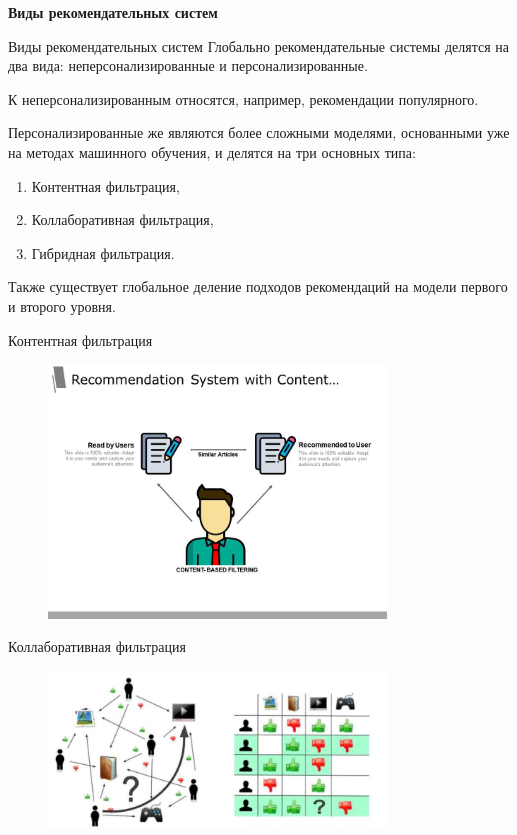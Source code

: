 \documentclass{beamer}
\begin{document}
\begin{frame}
  \begin{center}
    {\Huge \textbf{Виды рекомендательных систем}}
  \end{center}
\end{frame}

\begin{frame}{Виды рекомендательных систем}
  Глобально рекомендательные системы делятся на два вида: неперсонализированные и персонализированные.
  
  К неперсонализированным относятся, например, рекомендации популярного.

  Персонализированные же являются более сложными моделями, основанными уже на методах машинного обучения, и
  делятся на три основных типа:
  \begin{enumerate}
    \item Контентная фильтрация,
    \item Коллаборативная фильтрация,
    \item Гибридная фильтрация.
  \end{enumerate}

  Также существует глобальное деление подходов рекомендаций на модели первого и второго уровня.
\end{frame}

\begin{frame}{Контентная фильтрация}
  \begin{figure}[H]
    \centering
    \includegraphics[width=0.8\textwidth]{pic/2}
    \label{fig:img1}
  \end{figure}  
\end{frame}

\begin{frame}{Коллаборативная фильтрация}
  \begin{figure}[H]
    \centering
    \includegraphics[width=0.8\textwidth]{pic/3}
    \label{fig:img1}
  \end{figure}  
\end{frame}
\end{document}

